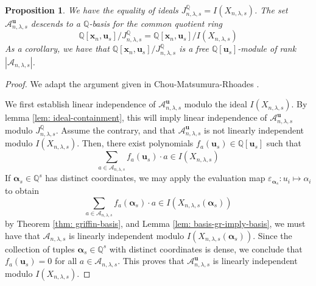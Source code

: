 \documentclass[11pt]{amsart}
\numberwithin{equation}{section}
\newtheorem{proposition}[theorem]{Proposition}
\theoremstyle{definition}
\newcommand{\AAA}{{\mathcal{A}}}
\newcommand{\QQ}{{\mathbb{Q}}}
\newcommand{\xxx}{{\mathbf{x}}}
\newcommand{\uuu}{{\mathbf{u}}}
\newcommand{\aalpha}{{{\bm \alpha}}}
\begin{document}
\begin{proposition}\label{prop: module-dim}
    We have the equality of ideals $J^\QQ_{n,\lambda,s} = I(X_{n,\lambda,s})$. The set $\AAA^\uuu_{n,\lambda,s}$ descends to a $\QQ$-basis for the common quotient ring
    \[
\QQ[\xxx_n,\uuu_s]/J^\QQ_{n,\lambda,s} = \QQ[\xxx_n,\uuu_s]/I(X_{n,\lambda,s})
\]
    As a corollary, we have that $\QQ[\xxx_n,\uuu_s]/J^\QQ_{n,\lambda,s}$ is a free $\QQ[\uuu_s]$-module of rank $|\AAA_{n,\lambda,s}|$.
\end{proposition}

\begin{proof}
    We adapt the argument given in Chou-Matsumura-Rhoades \cite{CMR}.
    
    We first establish linear independence of $\AAA^\uuu_{n,\lambda,s}$ modulo the ideal $I(X_{n,\lambda,s})$. By lemma \ref{lem: ideal-containment}, this will imply linear independence of $\AAA^\uuu_{n,\lambda,s}$ modulo $J^\QQ_{n,\lambda,s}$.
    Assume the contrary, and that $\AAA^\uuu_{n,\lambda,s}$ is not linearly independent modulo $I(X_{n,\lambda,s})$. Then, there exist polynomials $f_a(\uuu_s) \in \QQ[\uuu_s]$ such that
    \[
\sum_{a \in \AAA_{n,\lambda,s}} f_a(\uuu_s) \cdot a \in I(X_{n,\lambda,s})
\]
    If $\aalpha_s \in \QQ^s$ has distinct coordinates, we may apply the evaluation map $\varepsilon_{\aalpha_s}: u_i \mapsto \alpha_i$ to obtain
    \[
\sum_{a \in \AAA_{n,\lambda,s}} f_a(\aalpha_s) \cdot a \in I(X_{n,\lambda,s}(\aalpha_s))
\]
    by Theorem \ref{thm: griffin-basis}, and Lemma \ref{lem: basis-gr-imply-basis}, we must have that $\AAA_{n,\lambda,s}$ is linearly independent modulo $I(X_{n,\lambda,s}(\aalpha_s))$. Since the collection of tuples $\aalpha_s \in \QQ^s$ with distinct coordinates is dense, we conclude that $f_a(\uuu_s) = 0$ for all $a \in \AAA_{n,\lambda,s}$. This proves that $\AAA^\uuu_{n,\lambda,s}$ is linearly independent modulo $I(X_{n,\lambda,s})$.


\end{proof}
\end{document}
